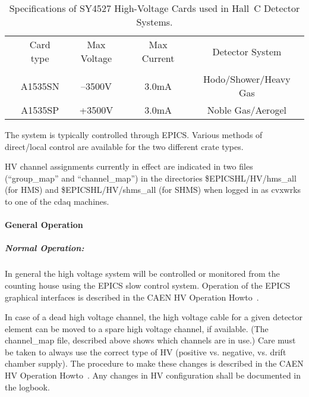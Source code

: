 \begin{table}
\caption{Specifications of SY4527 High-Voltage Cards used in Hall~C Detector 
Systems\label{tab:hv_cards_new}.}
\begin{center}
\begin{tabular}{ccccc}
  &Card type      &Max Voltage    &Max Current    &Detector System \\
  &		&		&		&	\\
  & A1535SN       &--3500V	&3.0mA		&Hodo/Shower/Heavy Gas\\
  & A1535SP       &+3500V    &3.0mA		&Noble Gas/Aerogel\\

  \end{tabular}
\end{center}
\end{table}

The system is typically controlled through EPICS.  Various methods of
direct/local control are available for the two different crate types.


HV channel assignments currently in effect are indicated in 
two files (``group\_map'' and
``channel\_map'') in the directories \$EPICSHL/HV/hms\_all (for HMS) and
\$EPICSHL/HV/shms\_all (for
SHMS) when logged in as cvxwrks to one of the cdaq machines.

\paragraph{General Operation}

\subparagraph{Normal Operation:}

In general the high voltage system will be controlled or monitored
from the counting house using the EPICS slow control system.
Operation of the EPICS graphical interfaces is described in the CAEN
HV Operation Howto~\cite{howto:CAEN_HV_operation}.

In case of a dead high voltage channel, the high voltage cable for a
given detector element can be moved 
to a spare high voltage channel, if available.  (The channel\_map
file, described above shows which channels are in use.)  Care must be
taken to always use the correct type of HV (positive vs. negative,
vs. drift chamber supply).  The procedure to make these changes is
described in the CAEN HV Operation
Howto~\cite{howto:CAEN_HV_operation}.  Any changes in HV configuration
shall be documented in the logbook.

